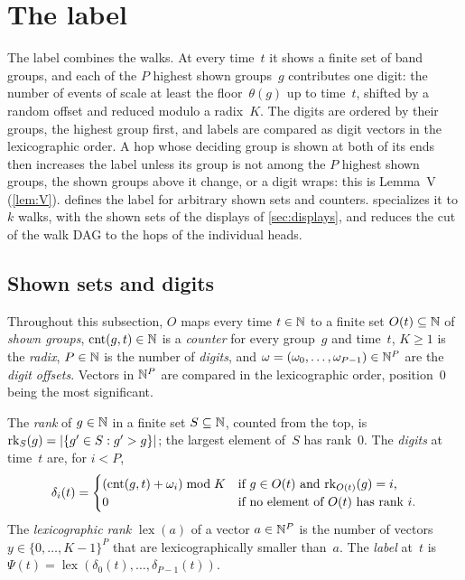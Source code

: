 \section{The label}\label{sec:label}

The label combines the walks. At every time~$t$ it shows a finite set of band groups, and each of the $P$ highest shown
groups~$g$ contributes one digit: the number of events of scale at least the floor~$\theta(g)$ up to time~$t$, shifted by a
random offset and reduced modulo a radix~$K$. The digits are ordered by their groups, the highest group first, and labels are compared as digit vectors in the
lexicographic order. A hop whose deciding group is shown at both of its ends then increases the label unless its group is not
among the $P$ highest shown groups, the shown groups above it change, or a digit wraps: this is Lemma~V (\cref{lem:V}).
 defines the label for arbitrary shown sets and counters.  specializes it to $k$
walks, with the shown sets of the displays of \cref{sec:displays}, and reduces the cut of the walk DAG to the hops of the
individual heads.

\subsection{Shown sets and digits}\label{sec:label-digits}

Throughout this subsection, $O$ maps every time $t\in\mathbb{N}$ to a finite set $O(t)\subseteq\mathbb{N}$ of \emph{shown groups}, $\mathrm{cnt}(g,t)\in\mathbb{N}$
is a \emph{counter} for every group~$g$ and time~$t$, $K\ge1$ is the \emph{radix}, $P\in\mathbb{N}$ is the number of \emph{digits}, and
$\omega=(\omega_0,\dots,\omega_{P-1})\in\mathbb{N}^P$ are the \emph{digit offsets}. Vectors in $\mathbb{N}^P$ are compared in the lexicographic
order, position~$0$ being the most significant.

\begin{definition}\label{def:digitlabel}
The \emph{rank} of $g\in\mathbb{N}$ in a finite set $S\subseteq\mathbb{N}$, counted from the top, is
$\operatorname{rk}_S(g)=\lvert \{g'\in S:g'>g\} \rvert$; the largest element of~$S$ has rank~$0$. The \emph{digits} at time~$t$ are, for
$i<P$,
\[
  \delta_i(t)=\begin{cases}(\mathrm{cnt}(g,t)+\omega_i)\bmod K&\text{if $g\in O(t)$ and $\operatorname{rk}_{O(t)}(g)=i$,}\\
  0&\text{if no element of $O(t)$ has rank~$i$.}\end{cases}
\]
The \emph{lexicographic rank} $\operatorname{lex}(a)$ of a vector $a\in\mathbb{N}^P$ is the number of vectors $y\in\{0,\dots,K-1\}^P$ that
are lexicographically smaller than~$a$. The \emph{label} at~$t$ is $\Psi(t)=\operatorname{lex}(\delta_0(t),\dots,\delta_{P-1}(t))$.
\end{definition}

